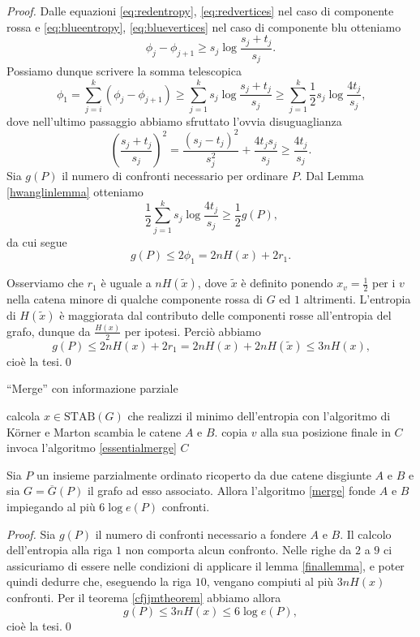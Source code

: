 \begin{proof}
	Dalle equazioni \eqref{eq:redentropy}, \eqref{eq:redvertices} nel caso di componente rossa e \eqref{eq:blueentropy}, \eqref{eq:bluevertices} nel caso di componente blu otteniamo
	\[
	  \phi_j - \phi_{j+1} \ge s_j\log{\frac{s_j+t_j}{s_j}}\text{.}
	\]
	Possiamo dunque scrivere la somma telescopica
	\[
	  \phi_1 = \sum_{j=i}^k{(\phi_j-\phi_{j+1})} \ge \sum_{j=1}^k{s_j\log{\frac{s_j+t_j}{s_j}}} \ge \sum_{j=1}^k{\frac{1}{2}s_j\log{\frac{4t_j}{s_j}}}\text{,}
	\]
	dove nell'ultimo passaggio abbiamo sfruttato l'ovvia disuguaglianza
	\[
	  \left(\frac{s_j+t_j}{s_j}\right)^2 = \frac{(s_j-t_j)^2}{s_j^2} + \frac{4t_{j}s_{j}}{s_j} \ge \frac{4t_j}{s_j}\text{.}
	\]
	Sia \(g(P)\) il numero di confronti necessario per ordinare \(P\). Dal Lemma \ref{hwanglinlemma} otteniamo
	\[
	  \frac{1}{2}\sum_{j=1}^k{s_j\log{\frac{4t_j}{s_j}}} \ge \frac{1}{2}g(P)\text{,}
	\]
	da cui segue
	\begin{equation}
	  g(P) \le 2\phi_1 = 2nH(x) + 2r_1\text{.}
	\end{equation}
	
	Osserviamo che \(r_1\) \`e uguale a \(nH(\tilde{x})\), dove \(\tilde{x}\) \`e definito ponendo \(x_v=\frac{1}{2}\) per i \(v\) nella catena minore di qualche componente rossa di \(G\) ed \(1\) altrimenti. L'entropia di \(H(\tilde{x})\) \`e maggiorata dal contributo delle componenti rosse all'entropia del grafo, dunque da \(\frac{H(x)}{2}\) per ipotesi. Perci\`o abbiamo
	\[ g(P)\le 2nH(x) + 2r_1 = 2nH(x) + 2nH(\tilde{x}) \le 3nH(x)\text{,} \]
	cio\`e la tesi.\qed 
\end{proof}
\begin{algorithm}
	\caption{``Merge'' con informazione parziale} \label{merge} 
	\begin{algorithmic}
		[1] \STATE calcola \(x\in\text{STAB}(G)\) che realizzi il minimo dell'entropia con l'algoritmo di K\"orner e Marton  \STATE scambia le catene \(A\) e \(B\). \ENDIF {}  \STATE copia \(v\) alla sua posizione finale in \(C\) \ENDIF \ENDFOR \STATE invoca l'algoritmo \ref{essentialmerge} \RETURN \(C\) 
	\end{algorithmic}
\end{algorithm}
\begin{theorem}
	\label{mergetheorem} Sia \(P\) un insieme parzialmente ordinato ricoperto da due catene disgiunte \(A\) e \(B\) e sia \(G=\overline{G}(P)\) il grafo ad esso associato. Allora l'algoritmo \ref{merge} fonde \(A\) e \(B\) impiegando al più \(6\log{e(P)}\) confronti. 
\end{theorem}
\begin{proof}
	Sia \(g(P)\) il numero di confronti necessario a fondere \(A\) e \(B\). Il calcolo dell'entropia alla riga \(1\) non comporta alcun confronto. Nelle righe da \(2\) a \(9\) ci assicuriamo di essere nelle condizioni di applicare il lemma \ref{finallemma}, e poter quindi dedurre che, eseguendo la riga \(10\), vengano compiuti al pi\`u \(3nH(x)\) confronti. Per il teorema \ref{cfjjmtheorem} abbiamo allora
	\[g(P)\le 3nH(x)\le 6\log{e(P)},\]
	cio\`e la tesi.\qed 
\end{proof}

